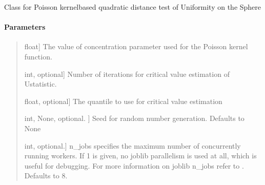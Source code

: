 \documentclass[letterpaper,10pt,english,openany,oneside]{sphinxmanual}
\begin{document}
\begin{fulllineitems}
\label{\detokenize{api_reference/generated/QuadratiK.poisson_kernel_test.PoissonKernelTest:QuadratiK.poisson_kernel_test.PoissonKernelTest}}
\pysigstartsignatures
{}
\pysigstopsignatures
\sphinxAtStartPar
Class for Poisson kernel\sphinxhyphen{}based quadratic distance 
test of Uniformity on the Sphere


\paragraph{Parameters}
\label{\detokenize{api_reference/generated/QuadratiK.poisson_kernel_test.PoissonKernelTest:parameters}}\begin{quote}
\begin{description}
\sphinxlineitem{rho}{[}float{]}
\sphinxAtStartPar
The value of concentration parameter used for the 
Poisson kernel function.

\sphinxlineitem{num\_iter}{[}int, optional{]}
\sphinxAtStartPar
Number of iterations for critical value estimation of U\sphinxhyphen{}statistic.

\sphinxlineitem{quantile}{[}float, optional{]}
\sphinxAtStartPar
The quantile to use for critical value estimation

\sphinxlineitem{random\_state}{[}int, None, optional. {]}
\sphinxAtStartPar
Seed for random number generation. Defaults to None

\sphinxlineitem{n\_jobs}{[}int, optional.{]}
\sphinxAtStartPar
n\_jobs specifies the maximum number of concurrently running workers. 
If 1 is given, no joblib parallelism is used at all, which is useful for debugging.
For more information on joblib n\_jobs refer 
to \sphinxhyphen{} . 
Defaults to 8.

\end{description}
\end{quote}



\end{fulllineitems}
\end{document}
